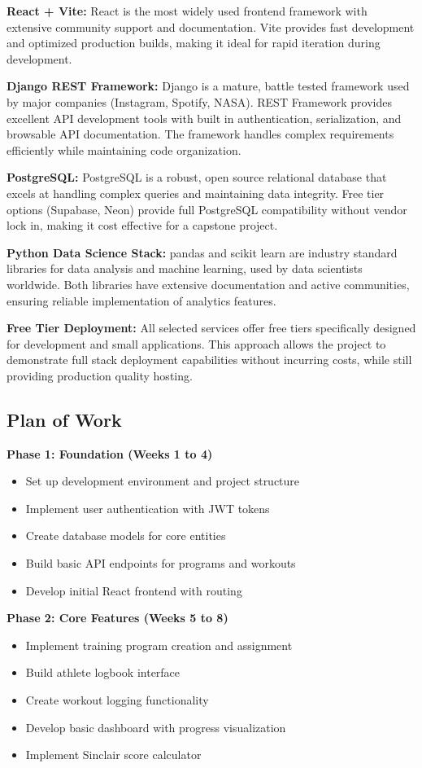 \documentclass[11pt, oneside]{article}   	%
\begin{document}
\textbf{React + Vite:} React is the most widely used frontend framework with extensive community support and documentation. Vite provides fast development and optimized production builds, making it ideal for rapid iteration during development.

\textbf{Django REST Framework:} Django is a mature, battle tested framework used by major companies (Instagram, Spotify, NASA). REST Framework provides excellent API development tools with built in authentication, serialization, and browsable API documentation. The framework handles complex requirements efficiently while maintaining code organization.

\textbf{PostgreSQL:} PostgreSQL is a robust, open source relational database that excels at handling complex queries and maintaining data integrity. Free tier options (Supabase, Neon) provide full PostgreSQL compatibility without vendor lock in, making it cost effective for a capstone project.

\textbf{Python Data Science Stack:} pandas and scikit learn are industry standard libraries for data analysis and machine learning, used by data scientists worldwide. Both libraries have extensive documentation and active communities, ensuring reliable implementation of analytics features.

\textbf{Free Tier Deployment:} All selected services offer free tiers specifically designed for development and small applications. This approach allows the project to demonstrate full stack deployment capabilities without incurring costs, while still providing production quality hosting.

\subsection*{Plan of Work}

\textbf{Phase 1: Foundation (Weeks 1 to 4)}
\begin{itemize}
    \item Set up development environment and project structure
    \item Implement user authentication with JWT tokens
    \item Create database models for core entities
    \item Build basic API endpoints for programs and workouts
    \item Develop initial React frontend with routing
\end{itemize}

\textbf{Phase 2: Core Features (Weeks 5 to 8)}
\begin{itemize}
    \item Implement training program creation and assignment
    \item Build athlete logbook interface
    \item Create workout logging functionality
    \item Develop basic dashboard with progress visualization
    \item Implement Sinclair score calculator
\end{itemize}
\end{document}
